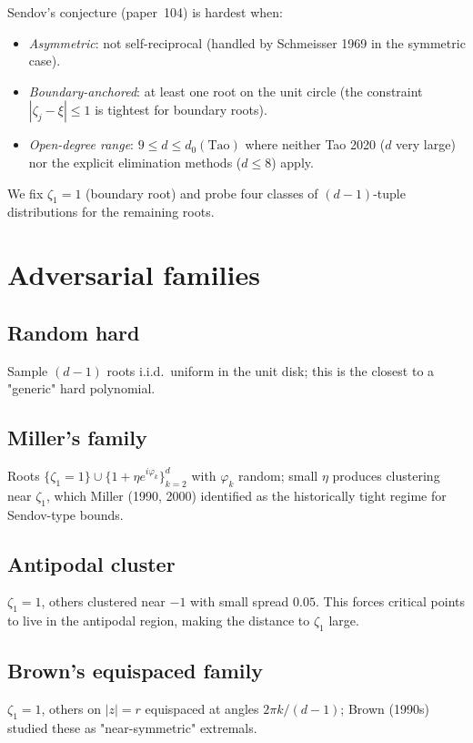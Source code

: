 \documentclass[11pt,a4paper]{article}
\begin{document}
Sendov's conjecture (paper~104) is hardest when:
\begin{itemize}
\item \emph{Asymmetric}: not self-reciprocal (handled by Schmeisser 1969 in the symmetric case).
\item \emph{Boundary-anchored}: at least one root on the unit circle (the constraint $|\zeta_j - \xi| \le 1$ is tightest for boundary roots).
\item \emph{Open-degree range}: $9 \le d \le d_0(\text{Tao})$ where neither Tao 2020 ($d$ very large) nor the explicit elimination methods ($d \le 8$) apply.
\end{itemize}

We fix $\zeta_1 = 1$ (boundary root) and probe four classes of $(d-1)$-tuple distributions for the remaining roots.

\section{Adversarial families}\label{sec:families}

\subsection{Random hard}
Sample $(d-1)$ roots i.i.d.\ uniform in the unit disk; this is the closest to a "generic" hard polynomial.

\subsection{Miller's family}
Roots $\{\zeta_1 = 1\} \cup \{1 + \eta e^{i\varphi_k}\}_{k=2}^{d}$ with $\varphi_k$ random; small $\eta$ produces clustering near $\zeta_1$, which Miller (1990, 2000) identified as the historically tight regime for Sendov-type bounds.

\subsection{Antipodal cluster}
$\zeta_1 = 1$, others clustered near $-1$ with small spread $0.05$. This forces critical points to live in the antipodal region, making the distance to $\zeta_1$ large.

\subsection{Brown's equispaced family}
$\zeta_1 = 1$, others on $|z| = r$ equispaced at angles $2\pi k/(d-1)$; Brown (1990s) studied these as "near-symmetric" extremals.
\end{document}

